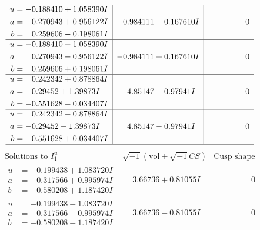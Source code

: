 \documentclass[1p]{elsarticle_modified}
\theoremstyle{definition}
\newcommand{\I}{\sqrt{-1}}
\begin{document}
$$\begin{array}{c|c|c}
\begin{aligned}
u &= -0.188410 + 1.058390 I \\
a &= \phantom{-}0.270943 + 0.956122 I \\
b &= \phantom{-}0.259606 - 0.198061 I\end{aligned}
 & -0.984111 - 0.167610 I & \phantom{-0.000000 } 0 \\ \hline\begin{aligned}
u &= -0.188410 - 1.058390 I \\
a &= \phantom{-}0.270943 - 0.956122 I \\
b &= \phantom{-}0.259606 + 0.198061 I\end{aligned}
 & -0.984111 + 0.167610 I & \phantom{-0.000000 } 0 \\ \hline\begin{aligned}
u &= \phantom{-}0.242342 + 0.878864 I \\
a &= -0.29452 + 1.39873 I \\
b &= -0.551628 - 0.034407 I\end{aligned}
 & \phantom{-}4.85147 + 0.97941 I & \phantom{-0.000000 } 0 \\ \hline\begin{aligned}
u &= \phantom{-}0.242342 - 0.878864 I \\
a &= -0.29452 - 1.39873 I \\
b &= -0.551628 + 0.034407 I\end{aligned}
 & \phantom{-}4.85147 - 0.97941 I & \phantom{-0.000000 } 0\\
 \hline 
 \end{array}$$\newpage$$\begin{array}{c|c|c}  
\text{Solutions to }I^u_{1}& \I (\text{vol} + \sqrt{-1}CS) & \text{Cusp shape}\\
 \hline 
\begin{aligned}
u &= -0.199438 + 1.083720 I \\
a &= -0.317566 + 0.995974 I \\
b &= -0.580208 + 1.187420 I\end{aligned}
 & \phantom{-}3.66736 + 0.81055 I & \phantom{-0.000000 } 0 \\ \hline\begin{aligned}
u &= -0.199438 - 1.083720 I \\
a &= -0.317566 - 0.995974 I \\
b &= -0.580208 - 1.187420 I\end{aligned}
 & \phantom{-}3.66736 - 0.81055 I & \phantom{-0.000000 } 0 \\ \hline\begin{aligned}

\end{aligned}
\end{array}$$
\end{document}

